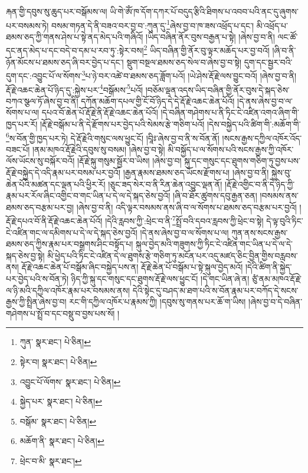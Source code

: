 རྐན་གྱི་དབུས་སུ་ཆུད་པར་བསྒོམས་ལ། ཡི་གེ་ཨོཾ་ཁ་དོག་དཀར་པོ་བདུད་རྩིའི་ཐིགས་པ་འབབ་པའི་ནང་དུ་ཞུགས་པར་བསམས་ཏེ། བསམ་གཏན་དེ་ནི་བཟའ་བར་བྱ་བ་:ཀུན་དུ་\footnote{ཀུན་  སྣར་ཐང་།  པེ་ཅིན། }ཞེས་བྱ་བ་ཁ་ཟས་འཕྲོད་པ་དང་། མི་འཕྲོད་པ་ཐམས་ཅད་ཀྱི་གནས་ཤེས་པ་སྟེ་ནད་མེད་པའི་གཞིའོ། །ཡིད་བཞིན་ནོར་བུས་བརྒྱན་པ་སྟེ། །ཞེས་བྱ་བ་ནི། ལང་ཚོ་དང་ནད་མེད་པ་དང་བདེ་བ་དམ་པ་རབ་ཏུ་:སྟེར་བས།\footnote{སྟེར་བ།  སྣར་ཐང་།  པེ་ཅིན། } ཡིད་བཞིན་གྱི་ནོར་བུ་ལྟར་མཆོད་པར་བྱ་བའོ། །ཞི་བ་ནི་ཉོན་མོངས་པ་ཐམས་ཅད་ཞི་བར་བྱེད་པ་དང་། སྡུག་བསྔལ་ཐམས་ཅད་སེལ་བ་ཞེས་བྱ་བ་སྟེ། དུག་དང་སྦྱར་བའི་དུག་དང་:འབྱུང་པོ་ལ་སོགས་\footnote{འབྱུང་པོ་ལོགས་  སྣར་ཐང་།  པེ་ཅིན། }པ་ཉེ་བར་འཚེ་བ་ཐམས་ཅད་ཟློག་པའོ། །ཡེ་ཤེས་རྡོ་རྗེ་ལས་བྱུང་བའོ། །ཞེས་བྱ་བ་ནི། རྡོ་རྗེ་འཆང་ཆེན་པོ་ཉིད་དུ་:སྐྱེས་པར་\footnote{སྐྱེད་པར་  སྣར་ཐང་།  པེ་ཅིན། }བསྒོམས་\footnote{བསྒོམ་  སྣར་ཐང་།  པེ་ཅིན། }པའོ། །བཅོམ་ལྡན་འདས་ཡིད་བཞིན་གྱི་ནོར་བུས་དེ་སྐད་ཅེས་བཀའ་སྩལ་ཏོ་ཞེས་བྱ་བ་ནི། དཀོན་མཆོག་དཔལ་གྱི་ངོ་བོ་ཉིད་དེ་དེ་རྡོ་རྗེ་འཆང་ཆེན་པོའོ། །དེ་ནས་ཞེས་བྱ་བ་ལ་སོགས་པ་ལ། དཔའ་བོ་ཆེན་པོ་རྡོ་རྗེ་ནི་རྡོ་རྗེ་འཆང་ཆེན་པོའོ། །དེ་བཞིན་གཤེགས་པ་ནི་ཏིང་ངེ་འཛིན་འགའ་ཞིག་གི་ཁྱད་པར་རོ། །རྡོ་རྗེ་བསྒོམ་པ་ནི་དེ་རྫོགས་པར་བྱེད་པའི་སེམས་རྩེ་གཅིག་པའོ། །དེས་བསྐྱེད་པའི་ཚིག་གི་:མཆོག་གི་\footnote{མཆོག་ནི་  སྣར་ཐང་།  པེ་ཅིན། }ས་བོན་གྱི་ཁྱད་པར་ཏེ། དེ་རྡོ་རྗེའི་གསུང་ལས་ཕྱུང་ངོ། །བཱིཿ་ཞེས་བྱ་བ་ནི་ས་བོན་ནོ། །སངས་རྒྱས་དཀྱིལ་འཁོར་འོད་བཟང་པོ། །ནམ་མཁའ་རྡོ་རྗེའི་དབུས་སུ་བསམ། །ཞེས་བྱ་བ་སྟེ། མི་བསྐྱོད་པ་ལ་སོགས་པའི་སངས་རྒྱས་ཀྱི་འཁོར་ལོས་ཡོངས་སུ་བསྐོར་བའོ། །རྡོ་རྗེ་སྐུ་གསུམ་སྦྱོར་བ་ཡིས། །ཞེས་བྱ་བ། སྐུ་དང་གསུང་དང་ཐུགས་གཅིག་ཏུ་བྱས་པས་རྡོ་རྗེ་བསྐྱེད་དེ་འདི་རྣམ་པར་བསམ་པར་བྱའོ། །རྒྱན་རྣམས་ཐམས་ཅད་ཡོངས་རྫོགས་པ། །ཞེས་བྱ་བ་ནི། སྐྱེས་བུ་ཆེན་པོའི་མཚན་དང་ལྡན་པའི་ཕྱིར་རོ། །ཅུང་ཟད་སེར་བ་ནི་རིན་ཆེན་འབྱུང་ལྡན་ནོ། །རྡོ་རྗེ་འགྱིང་བ་ནི་དེ་ཉིད་ཀྱི་རྣམ་པར་རོལ་ཞིང་འགྱིང་བ་གང་ཡིན་པ་དེ་ལ་དེ་སྐད་ཅེས་བྱའོ། །ཞི་བ་ཐོར་ཚུགས་དབུ་རྒྱན་ཅན། །བསམས་ནས་ཐམས་ཅད་བརྩམ་པར་བྱ། །ཞེས་བྱ་བ་ནི། འདི་ལྟར་བསམས་ནས་ཞི་བ་ལ་སོགས་པ་ཐམས་ཅད་བརྩམ་པར་བྱའོ། །རྡོ་རྗེ་དཔའ་བོ་ནི་རྡོ་རྗེ་འཆང་ཆེན་པོའོ། །དེའི་རླབས་ཀྱི་:ཕྲེང་བ་ནི་\footnote{ཕྲེང་བ་མི་  སྣར་ཐང་། }སྤྲོ་བའི་དབའ་རླབས་ཀྱི་ཕྲེང་བ་སྟེ། དེ་ལྟ་བུའི་ཏིང་ངེ་འཛིན་གང་ལ་དམིགས་པ་དེ་ལ་དེ་སྐད་ཅེས་བྱའོ། །དེ་ནས་ཞེས་བྱ་བ་ལ་སོགས་པ་ལ། ཀུན་ནས་སངས་རྒྱས་ཐམས་ཅད་ཀྱིས་རྣམ་པར་བསྒྲགས་ཤིང་བསྟོད་པ། སྐུལ་བྱེད་མའི་གཟུགས་ཀྱི་ཏིང་ངེ་འཛིན་གང་ཡིན་པ་དེ་ལ་དེ་སྐད་ཅེས་བྱ་སྟེ། མི་ཕྱེད་པའི་ཏིང་ངེ་འཛིན་དེ་ལ་ཐུགས་རྩེ་གཅིག་ཏུ་མངོན་པར་འདུ་མཛད་ཅིང་བྱིན་གྱིས་བརླབས་ནས། རྡོ་རྗེ་འཆང་ཆེན་པོ་བསྒོམ་ཞིང་བསྐྱེད་པས་ན། རྡོ་རྗེ་ཆེན་པོ་བསྒོམ་པ་སྟེ་སྐུལ་བྱེད་མའོ། །དེའི་ཚིག་ནི་སྐྱེད་པར་བྱེད་པའི་ས་བོན་ཏེ། ཉིད་ཀྱི་སྐུ་དང་གསུང་དང་ཐུགས་རྡོ་རྗེ་ལས་ཕྱུང་ངོ། །དེ་གང་ཡིན་ཞེ་ན། ཙུཾ་ནམ་མཁའ་རྡོ་རྗེ་ལ་ཉི་མའི་དཀྱིལ་འཁོར་རྣམ་པར་བསམས་ནས། དེའི་སྟེང་དུ་བཤད་མ་ཐག་པའི་ས་བོན་རྣམ་པར་བཀོད་དེ་སངས་རྒྱས་ཀྱི་སྤྲིན་ཞེས་བྱ་བ། རང་གི་དཀྱིལ་འཁོར་པ་རྣམས་ཀྱི། །དབུས་སུ་གནས་པར་ཆོ་ག་ཡིས། །ཞེས་བྱ་བ་དེ་བཞིན་གཤེགས་པ་སྤྲོ་བ་དང་བསྡུ་བ་བྱས་པས་སོ། །
